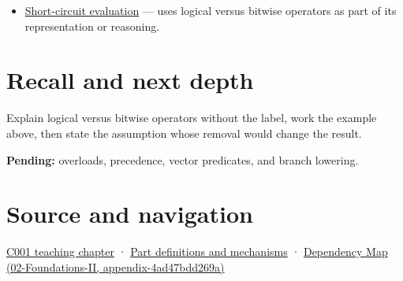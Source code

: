 \begin{itemize}
\tightlist
\item
  \hyperref[appendix-2e245a6fa8d3]{Short-circuit evaluation} --- uses logical versus bitwise operators as part of its representation or reasoning.
\end{itemize}

\section{Recall and next depth}\label{appendix-fe6b457d68d8-recall-and-next-depth}

Explain logical versus bitwise operators without the label, work the example above, then state the assumption whose removal would change the result.

\textbf{Pending:} overloads, precedence, vector predicates, and branch lowering.

\section{Source and navigation}\label{appendix-fe6b457d68d8-source-and-navigation}

\href{Continuous\%20Notes/Computing\%20Foundations\%20-\%20From\%20Bits\%20to\%20C++\%20and\%20Systems\%20APIs\#From\%20a\%20signal\%20to\%20an\%20interpretation}{C001 teaching chapter} · \hyperref[appendix-fd090d982a15]{Part definitions and mechanisms} · \href{../02-Foundations-II/main.pdf\#nameddest=appendix-4ad47bdd269a}{Dependency Map (02-Foundations-II, appendix-4ad47bdd269a)}
